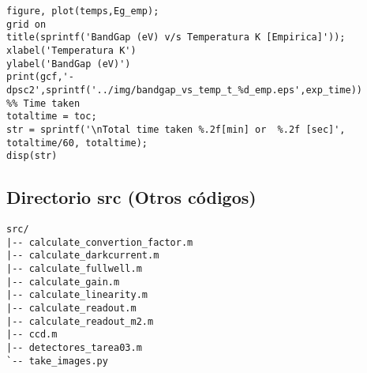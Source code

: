\documentclass[a4paper,10pt]{article}
\begin{document}
{\begin{verbatim}
figure, plot(temps,Eg_emp);
grid on
title(sprintf('BandGap (eV) v/s Temperatura K [Empirica]'));
xlabel('Temperatura K')
ylabel('BandGap (eV)')
print(gcf,'-dpsc2',sprintf('../img/bandgap_vs_temp_t_%d_emp.eps',exp_time))
%% Time taken
totaltime = toc;
str = sprintf('\nTotal time taken %.2f[min] or  %.2f [sec]', totaltime/60, totaltime);
disp(str)
\end{verbatim}
}

\subsection{Directorio src (Otros códigos)}
{\tiny 
\begin{verbatim}
src/
|-- calculate_convertion_factor.m
|-- calculate_darkcurrent.m
|-- calculate_fullwell.m
|-- calculate_gain.m
|-- calculate_linearity.m
|-- calculate_readout.m
|-- calculate_readout_m2.m
|-- ccd.m
|-- detectores_tarea03.m
`-- take_images.py
\end{verbatim}
}
\end{document}
